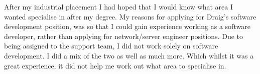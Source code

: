 \documentclass[paper=a4, fontsize=11pt]{scrartcl}	%
\begin{document}
After my industrial placement I had hoped that I would know what area I wanted specialise in after my degree. My reasons for applying for Draig's software development position, was so that I could gain experience working as a software developer, rather than applying for network/server engineer positions. Due to being assigned to the support team, I did not work solely on software development. I did a mix of the two as well as much more. Which whilst it was a great experience, it did not help me work out what area to specialise in.
\end{document}
